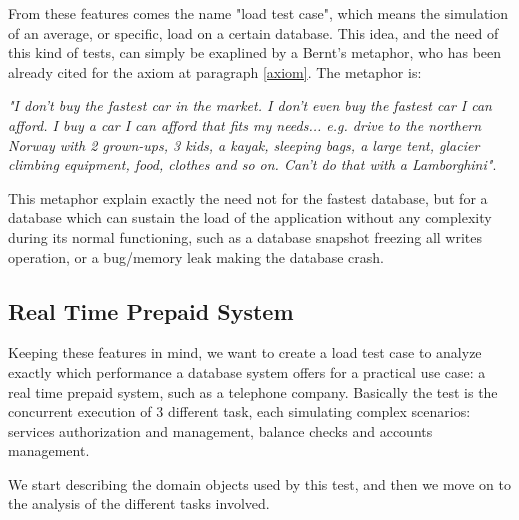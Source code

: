 From these features comes the name "load test case", which means the simulation of an average, or specific, load on a certain database. This idea, and the need of this kind of tests,  can simply be exaplined by a Bernt's metaphor, who has been already cited for the axiom at paragraph \ref{axiom}. The metaphor is:

\emph{"I don't buy the fastest car in the market. I don't even buy the fastest car I can afford. I buy a car I can afford that fits my needs... e.g. drive to the northern Norway with 2 grown-ups, 3 kids, a kayak, sleeping bags, a large tent, glacier climbing equipment, food, clothes and so on. Can't do that with a Lamborghini"}\cite{Bernt}.

This metaphor explain exactly the need not for the fastest database, but for a database which can sustain the load of the application without any complexity during its normal functioning, such as a database snapshot freezing all writes operation, or a bug/memory leak making the database crash.

		\subsection{Real Time Prepaid System} \label{real-time-test-case}
Keeping these features in mind, we want to create a load test case to analyze exactly which performance  a database system  offers for a practical use case: a real time prepaid system, such as a telephone company. Basically the test is the concurrent execution of 3 different task, each simulating complex scenarios: services authorization and management, balance checks and accounts management.

We start describing the domain objects used by this test, and then we move on to the analysis of the different tasks involved.
		
